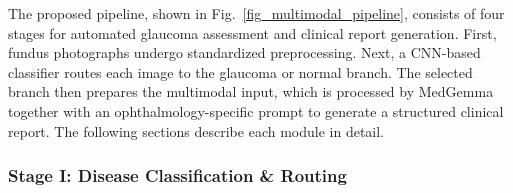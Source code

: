 \documentclass[runningheads]{llncs}
\newcommand{\todo}[1]{\textcolor{red}{\textbf{[TODO: #1]}}}
\begin{document}
The proposed pipeline, shown in Fig.~\ref{fig_multimodal_pipeline}, consists of four stages for automated glaucoma assessment and clinical report generation. First, fundus photographs undergo standardized preprocessing. Next, a CNN-based classifier routes each image to the glaucoma or normal branch. The selected branch then prepares the multimodal input, which is processed by MedGemma together with an ophthalmology-specific prompt to generate a structured clinical report. The following sections describe each module in detail.



\subsubsection{Stage I: Disease Classification \& Routing}


\end{document}
